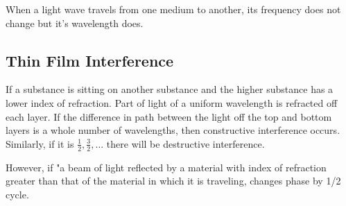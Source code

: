 \documentclass{article}
\begin{document}
When a light wave travels from one medium to another, its frequency does not change but it's wavelength does.

\subsection{Thin Film Interference} %
If a substance is sitting on another substance and the higher substance has a lower index of refraction. Part of light of a uniform wavelength is refracted off each layer. If the difference in path between the light off the top and bottom layers is a whole number of wavelengths, then constructive interference occurs. Similarly, if it is $\frac{1}{2}, \frac{3}{2} , \dots$ there will be destructive interference.

However, if "a beam of light reflected by a material with index of refraction greater than that of the material in which it is traveling, changes phase by 1/2 cycle.
\end{document}
